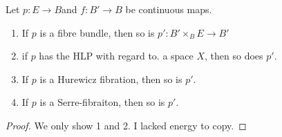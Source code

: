 \documentclass[language=english]{TemplateLecture}
\begin{document}
\begin{thm}
    Let \(p \colon E \to B\)and \(f\colon B' \to B\) be continuous maps.
    \begin{enumerate}
        \item If \(p\) is a fibre bundle, then so is \(p'\colon B' \times_B E \to B'\)
        \item if \(p\) has the HLP with regard to. a space \(X\), then so does \(p'\).
        \item If \(p\) is a Hurewicz fibration, then so is \(p'\).
        \item If \(p\) is a Serre-fibraiton, then so is \(p'\).
    \end{enumerate}
\end{thm}

\begin{proof}
    We only show 1 and 2. I lacked energy to copy.
\end{proof}
\end{document}
